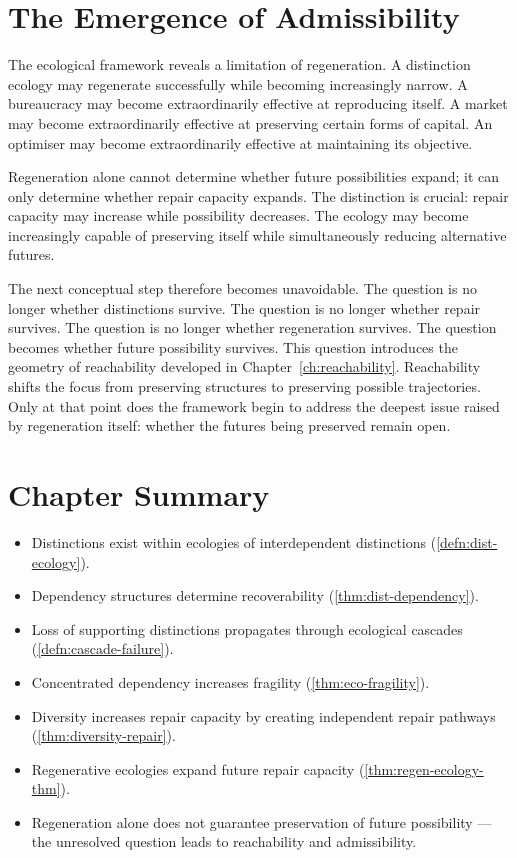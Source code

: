 \documentclass[12pt,twoside,openright]{book}
\newenvironment{chapsummary}{%
  \begin{tcolorbox}[colback=DistBlue!5,colframe=DistBlue,
    title={\faBookOpen\enspace Summary},
    fonttitle=\sffamily\bfseries\color{white},
    attach boxed title to top left={yshift=-2mm,xshift=4mm},
    boxed title style={colback=DistBlue,rounded corners}]
  \begin{itemize}[nosep,leftmargin=*]}{%
  \end{itemize}\end{tcolorbox}}
\begin{document}
\section{The Emergence of Admissibility}
\label{sec:ch12-emergence}

The ecological framework reveals a limitation of
regeneration. A distinction ecology may regenerate
successfully while becoming increasingly narrow. A
bureaucracy may become extraordinarily effective at
reproducing itself. A market may become extraordinarily
effective at preserving certain forms of capital. An
optimiser may become extraordinarily effective at
maintaining its objective.

Regeneration alone cannot determine whether future
possibilities expand; it can only determine whether repair
capacity expands. The distinction is crucial: repair
capacity may increase while possibility decreases. The
ecology may become increasingly capable of preserving
itself while simultaneously reducing alternative futures.

The next conceptual step therefore becomes unavoidable. The
question is no longer whether distinctions survive. The
question is no longer whether repair survives. The question
is no longer whether regeneration survives. The question
becomes whether future possibility survives. This question
introduces the geometry of reachability developed in
Chapter~\ref{ch:reachability}. Reachability shifts the
focus from preserving structures to preserving possible
trajectories. Only at that point does the framework begin
to address the deepest issue raised by regeneration itself:
whether the futures being preserved remain open.

\section*{Chapter Summary}
\begin{chapsummary}
  \item Distinctions exist within ecologies of
        interdependent distinctions
        (\cref{defn:dist-ecology}).
  \item Dependency structures determine recoverability
        (\cref{thm:dist-dependency}).
  \item Loss of supporting distinctions propagates through
        ecological cascades (\cref{defn:cascade-failure}).
  \item Concentrated dependency increases fragility
        (\cref{thm:eco-fragility}).
  \item Diversity increases repair capacity by creating
        independent repair pathways
        (\cref{thm:diversity-repair}).
  \item Regenerative ecologies expand future repair
        capacity (\cref{thm:regen-ecology-thm}).
  \item Regeneration alone does not guarantee preservation
        of future possibility --- the unresolved question
        leads to reachability and admissibility.
\end{chapsummary}
\end{document}
